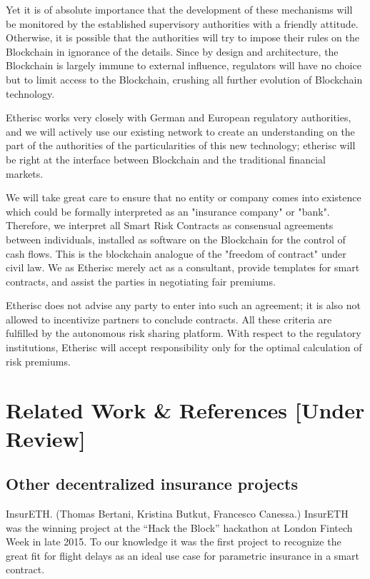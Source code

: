 \documentclass[12pt]{article}
\begin{document}
Yet it is of absolute importance that the development of these mechanisms will be monitored by  the established supervisory authorities with a friendly attitude. Otherwise, it is possible that the authorities will try to impose their rules on the Blockchain in ignorance of the details. Since by design and architecture, the Blockchain is largely immune to external influence, regulators will have no choice but to limit access to the Blockchain, crushing all further evolution of  Blockchain technology.

Etherisc works very closely with German and European regulatory authorities, and we will actively use our existing network to create an understanding on the part of the authorities of the particularities of this new technology; etherisc will be right at the interface between Blockchain and the traditional financial markets.

We will take great care to ensure that no entity or company comes into existence which could be formally interpreted as an "insurance company" or "bank". Therefore, we interpret all Smart Risk Contracts as consensual agreements between individuals, installed as software on the Blockchain for the control of cash flows. This is the blockchain analogue of the "freedom of contract" under civil law. We as Etherisc merely act as a consultant, provide templates for smart contracts, and assist the parties in negotiating fair premiums.

Etherisc does not advise any party to enter into such an agreement; it is also not allowed  to incentivize partners to conclude contracts. All these criteria are fulfilled by the autonomous risk sharing platform. With respect to the regulatory institutions, Etherisc will accept responsibility only for the optimal calculation of risk premiums.

\section{Related Work \& References [Under Review]}

\subsection{Other decentralized insurance projects}

InsurETH. (Thomas Bertani, Kristina Butkut, Francesco Canessa.) InsurETH was the winning project at the “Hack the Block” hackathon at London Fintech Week in late 2015. To our knowledge it was the first project to recognize the great fit for flight delays as an ideal use case for parametric insurance in a smart contract. 
\end{document}
